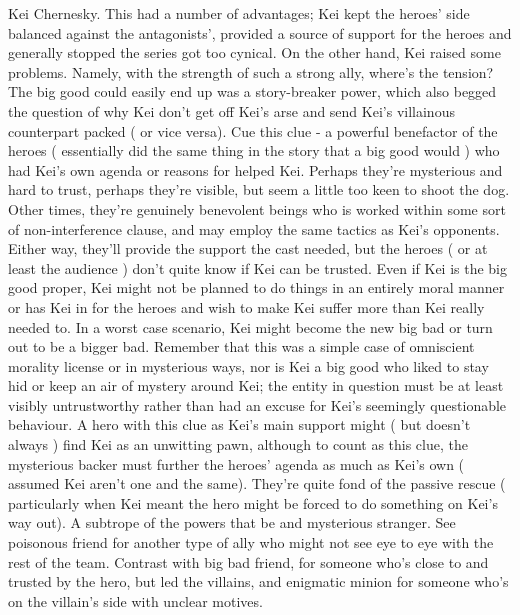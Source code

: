 \documentclass[12pt]{book}
\begin{document}
Kei Chernesky. This had a number of advantages; Kei kept the heroes' side balanced against the antagonists', provided a source of support for the heroes and generally stopped the series got too cynical. On the other hand, Kei raised some problems. Namely, with the strength of such a strong ally, where's the tension? The big good could easily end up was a story-breaker power, which also begged the question of why Kei don't get off Kei's arse and send Kei's villainous counterpart packed ( or vice versa). Cue this clue - a powerful benefactor of the heroes ( essentially did the same thing in the story that a big good would ) who had Kei's own agenda or reasons for helped Kei. Perhaps they're mysterious and hard to trust, perhaps they're visible, but seem a little too keen to shoot the dog. Other times, they're genuinely benevolent beings who is worked within some sort of non-interference clause, and may employ the same tactics as Kei's opponents. Either way, they'll provide the support the cast needed, but the heroes ( or at least the audience ) don't quite know if Kei can be trusted. Even if Kei is the big good proper, Kei might not be planned to do things in an entirely moral manner or has Kei in for the heroes and wish to make Kei suffer more than Kei really needed to. In a worst case scenario, Kei might become the new big bad or turn out to be a bigger bad. Remember that this was a simple case of omniscient morality license or in mysterious ways, nor is Kei a big good who liked to stay hid or keep an air of mystery around Kei; the entity in question must be at least visibly untrustworthy rather than had an excuse for Kei's seemingly questionable behaviour. A hero with this clue as Kei's main support might ( but doesn't always ) find Kei as an unwitting pawn, although to count as this clue, the mysterious backer must further the heroes' agenda as much as Kei's own ( assumed Kei aren't one and the same). They're quite fond of the passive rescue ( particularly when Kei meant the hero might be forced to do something on Kei's way out). A subtrope of the powers that be and mysterious stranger. See poisonous friend for another type of ally who might not see eye to eye with the rest of the team. Contrast with big bad friend, for someone who's close to and trusted by the hero, but led the villains, and enigmatic minion for someone who's on the villain's side with unclear motives.
\end{document}
